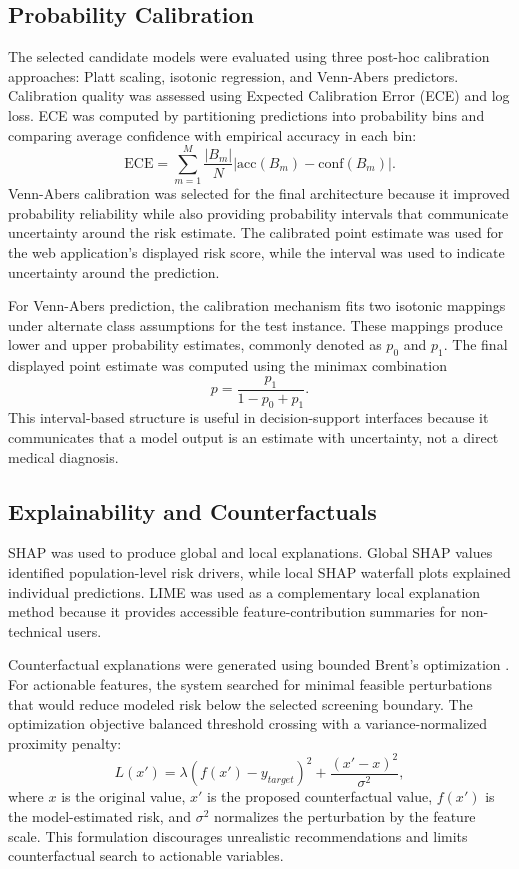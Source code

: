 \documentclass[journal]{IEEEtran}
\begin{document}
\subsection{Probability Calibration}
The selected candidate models were evaluated using three post-hoc calibration approaches: Platt scaling, isotonic regression, and Venn-Abers predictors. Calibration quality was assessed using Expected Calibration Error (ECE) and log loss. ECE was computed by partitioning predictions into probability bins and comparing average confidence with empirical accuracy in each bin:
\begin{equation}
\mathrm{ECE}=\sum_{m=1}^{M}\frac{|B_m|}{N}\left|\mathrm{acc}(B_m)-\mathrm{conf}(B_m)\right| .
\end{equation}
Venn-Abers calibration was selected for the final architecture because it improved probability reliability while also providing probability intervals that communicate uncertainty around the risk estimate. The calibrated point estimate was used for the web application's displayed risk score, while the interval was used to indicate uncertainty around the prediction.

For Venn-Abers prediction, the calibration mechanism fits two isotonic mappings under alternate class assumptions for the test instance. These mappings produce lower and upper probability estimates, commonly denoted as $p_0$ and $p_1$. The final displayed point estimate was computed using the minimax combination
\begin{equation}
p = \frac{p_1}{1-p_0+p_1}.
\end{equation}
This interval-based structure is useful in decision-support interfaces because it communicates that a model output is an estimate with uncertainty, not a direct medical diagnosis.

\subsection{Explainability and Counterfactuals}
SHAP was used to produce global and local explanations. Global SHAP values identified population-level risk drivers, while local SHAP waterfall plots explained individual predictions. LIME was used as a complementary local explanation method because it provides accessible feature-contribution summaries for non-technical users.

Counterfactual explanations were generated using bounded Brent's optimization \cite{virtanen2020scipy}. For actionable features, the system searched for minimal feasible perturbations that would reduce modeled risk below the selected screening boundary. The optimization objective balanced threshold crossing with a variance-normalized proximity penalty:
\begin{equation}
L(x') = \lambda (f(x')-y_{target})^2 + \frac{(x'-x)^2}{\sigma^2},
\end{equation}
where $x$ is the original value, $x'$ is the proposed counterfactual value, $f(x')$ is the model-estimated risk, and $\sigma^2$ normalizes the perturbation by the feature scale. This formulation discourages unrealistic recommendations and limits counterfactual search to actionable variables.
\end{document}
